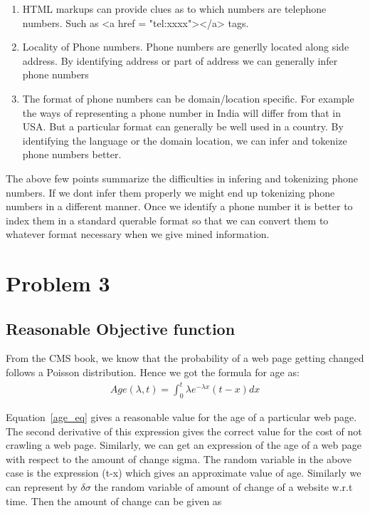 \documentclass{article}
\begin{document}
\begin{enumerate}
  \item HTML markups can provide clues as to which numbers are telephone numbers.  Such as <a href = "tel:xxxx"></a> tags.
  \item Locality of Phone numbers. Phone numbers are generlly located along side address.  By identifying address or part of address we can generally infer phone numbers
  \item  The format of phone numbers can be domain/location specific.  For example the ways of representing a phone number in India will differ from that in USA.  But a particular format can generally be well used in a country.  By identifying the language or the domain location, we can infer and tokenize phone numbers better.
\end{enumerate}

The above few points summarize the difficulties in infering and tokenizing phone numbers.  If we dont infer them properly we might end up tokenizing phone numbers in a different manner.  Once we identify a phone number it is better to index them in a standard querable format so that we can convert them to whatever format necessary when we give mined information.

\section[Problem 3]{Problem 3}
\subsection{Reasonable Objective function}
From the CMS book, we know that the probability of a web page getting changed follows a Poisson distribution.  Hence we got the formula for age as:
\begin{align}
  \label{age_eq}
  Age(\lambda, t) = \int_{0}^{t} \lambda e^{-\lambda x}(t - x)dx
\end{align}

Equation~\eqref{age_eq} gives a reasonable value for the age of a particular web page.  The second derivative of this expression gives the correct value for the cost of not crawling a web page.  Similarly, we can get an expression of the age of a web page with respect to the amount of change sigma.  The random variable in the above case is the expression (t-x) which gives an approximate value of age.  Similarly we can represent by $\delta\sigma$ the random variable of amount of change of a website w.r.t time.  Then the amount of change can be given as 
\end{document}
